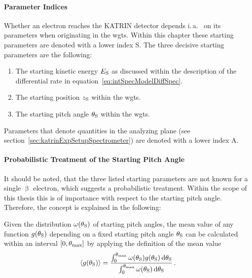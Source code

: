 \paragraph{Parameter Indices}
Whether an electron reaches the KATRIN detector depends i.\,a.~ on its parameters when originating in the \gls{wgts}. Within this chapter these starting parameters are denoted with a lower index $\mathrm{S}$. The three decisive starting parameters are the following:
\begin{enumerate}
	\item The starting kinetic energy $E_\mathrm{S}$ as discussed within the description of the differential rate in equation~\eqref{eq:intSpecModelDiffSpec}.	
	\item The starting position $z_\mathrm{S}$ within the \gls{wgts}.
	\item The starting pitch angle $\theta_\mathrm{S}$ within the \gls{wgts}.
\end{enumerate}
Parameters that denote quantities in the analyzing plane (see section~\ref{sec:katrinExpSetupSpectrometer}) are denoted with a lower index $\mathrm{A}$.

\paragraph{Probabilistic Treatment of  the Starting Pitch Angle}
It should be noted, that the three listed starting parameters are not known for a single $\upbeta$ electron, which suggests a probabilistic treatment. Within the scope of this thesis this is of importance with respect to the starting pitch angle. Therefore, the concept is explained in the following:

Given the distribution $\omega(\theta_\mathrm{S})$ of starting pitch angles, the mean value of any function $g(\theta_\mathrm{S})$ depending on a fixed starting pitch angle $\theta_\mathrm{S}$ can be calculated within an interval $[0, \theta_\mathrm{max}]$ by applying the definition of the mean value
\begin{equation}
\label{eq:intSpecModelPitchAngleAveraging}
\left\langle{g(\theta_\mathrm{S})}\right\rangle = 
\frac{
	\int_{0}^{\theta_\mathrm{max}} 
	\omega(\theta_\mathrm{S})
	g(\theta_\mathrm{S})
	\mathop{}\!\mathrm{d} \theta_\mathrm{S}   
}{
	\int_{0}^{\theta_\mathrm{max}} 
	\omega(\theta_\mathrm{S})
	\mathop{}\!\mathrm{d} \theta_\mathrm{S} 
} \text{\,.}
\end{equation}

